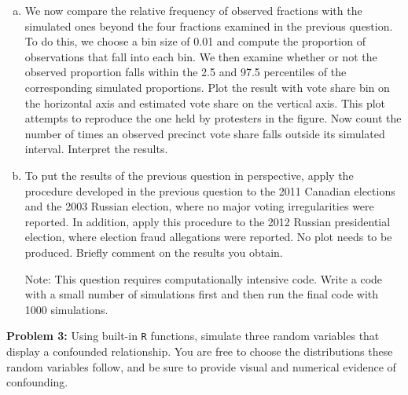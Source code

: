 \documentclass[11pt]{article}
\begin{document}
\begin{enumerate}[a.]
\item We now compare the relative frequency of observed fractions with the simulated ones beyond the four fractions examined in the previous question.  To do this, we choose a bin size of 0.01 and compute the proportion of observations that fall into each bin.  We then examine whether or not the observed proportion falls within the 2.5 and 97.5 percentiles of the corresponding simulated proportions. Plot the result with vote share bin on the horizontal axis and estimated vote share on the vertical axis. This plot attempts to reproduce the one held by protesters in the figure.  Now count the number of times an observed precinct vote share falls outside its simulated interval.  Interpret the results.
\item To put the results of the previous question in perspective, apply the procedure developed in the previous question to the 2011 Canadian elections and the 2003 Russian election, where no major voting irregularities were reported.  In addition, apply this procedure to the 2012 Russian presidential election, where election fraud allegations were reported.  No plot needs to be produced. Briefly comment on the results you obtain.

Note: This question requires computationally intensive code. Write a code with a small number of simulations first and then run the final code with 1000 simulations.
\end{enumerate}


\vspace{7mm}
\noindent \textbf{Problem 3:} Using built-in {\tt R} functions, simulate three random variables that display a confounded relationship.  You are free to choose the distributions these random variables follow, and be sure to provide visual and numerical evidence of confounding.  
\end{document}
